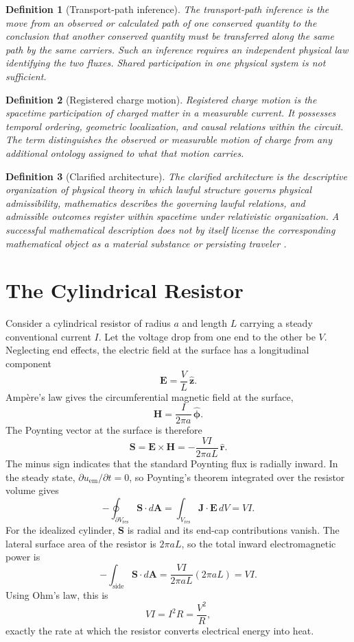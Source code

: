 \documentclass[12pt,onecolumn]{article}
\newtheorem{definition}{Definition}
\begin{document}
\begin{definition}[Transport-path inference]
\label{def:pathinference}
The transport-path inference is the move from an observed or calculated path of one conserved quantity to the conclusion that another conserved quantity must be transferred along the same path by the same carriers. Such an inference requires an independent physical law identifying the two fluxes. Shared participation in one physical system is not sufficient.
\end{definition}

\begin{definition}[Registered charge motion]
\label{def:registeredmotion}
Registered charge motion is the spacetime participation of charged matter in a measurable current. It possesses temporal ordering, geometric localization, and causal relations within the circuit. The term distinguishes the observed or measurable motion of charge from any additional ontology assigned to what that motion carries.
\end{definition}

\begin{definition}[Clarified architecture]
\label{def:clarifiedarchitecture}
The clarified architecture is the descriptive organization of physical theory in which lawful structure governs physical admissibility, mathematics describes the governing lawful relations, and admissible outcomes register within spacetime under relativistic organization. A successful mathematical description does not by itself license the corresponding mathematical object as a material substance or persisting traveler \cite{unified,bedrock,fermion}.
\end{definition}


\section{The Cylindrical Resistor}

Consider a cylindrical resistor of radius $a$ and length $L$ carrying a steady conventional current $I$. Let the voltage drop from one end to the other be $V$. Neglecting end effects, the electric field at the surface has a longitudinal component
\[
\mathbf E=\frac{V}{L}\,\hat{\mathbf z}.
\]
Amp\`ere's law gives the circumferential magnetic field at the surface,
\[
\mathbf H=\frac{I}{2\pi a}\,\hat{\boldsymbol\phi}.
\]
The Poynting vector at the surface is therefore
\[
\mathbf S=\mathbf E\times\mathbf H
=-\frac{VI}{2\pi aL}\,\hat{\mathbf r}.
\]
The minus sign indicates that the standard Poynting flux is radially inward. In the steady state, $\partial u_{\mathrm{em}}/\partial t=0$, so Poynting's theorem integrated over the resistor volume gives
\[
-\oint_{\partial V_{\mathrm{res}}}\mathbf S\cdot d\mathbf A
=\int_{V_{\mathrm{res}}}\mathbf J\cdot\mathbf E\,dV
=VI.
\]
For the idealized cylinder, $\mathbf S$ is radial and its end-cap contributions vanish. The lateral surface area of the resistor is $2\pi aL$, so the total inward electromagnetic power is
\[
-\int_{\mathrm{side}}\mathbf S\cdot d\mathbf A
=\frac{VI}{2\pi aL}(2\pi aL)
=VI.
\]
Using Ohm's law, this is
\[
VI=I^2R=\frac{V^2}{R},
\]
exactly the rate at which the resistor converts electrical energy into heat.
\end{document}
